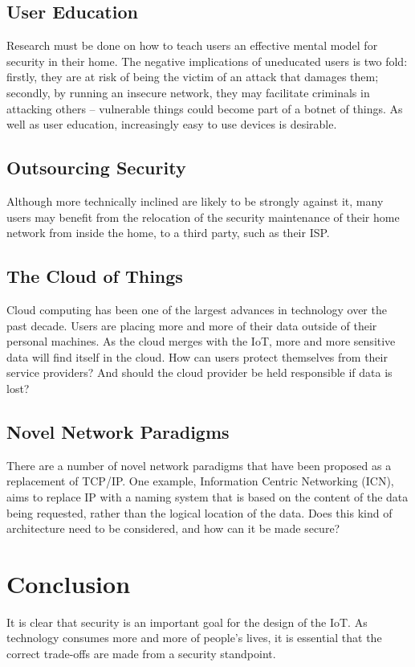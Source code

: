 \documentclass[10pt,journal,compsoc]{IEEEtran}
\begin{document}
\subsection{User Education}
Research must be done on how to teach users an effective mental model for
security in their home. The negative implications of uneducated users is two
fold: firstly, they are at risk of being the victim of an attack that damages
them; secondly, by running an insecure network, they may facilitate criminals
in attacking others -- vulnerable things could become part of a botnet of
things. As well as user education, increasingly easy to use devices is
desirable. 

\subsection{Outsourcing Security}
Although more technically inclined are likely to be strongly against it, many
users may benefit from the relocation of the security maintenance of their home
network from inside the home, to a third party, such as their ISP. 

\subsection{The Cloud of Things}
Cloud computing has been one of the largest advances in technology over the
past decade. Users are placing more and more of their data outside of their
personal machines. As the cloud merges with the IoT, more and more sensitive
data will find itself in the cloud. How can users protect themselves from their
service providers? And should the cloud provider be held responsible if data is
lost?

\subsection{Novel Network Paradigms}
There are a number of novel network paradigms that have been proposed as a
replacement of TCP/IP. One example, Information Centric Networking (ICN), aims
to replace IP with a naming system that is based on the content of the data
being requested, rather than the logical location of the data. Does this kind of
architecture need to be considered, and how can it be made secure?


\section{Conclusion}
It is clear that security is an important goal for the design of the IoT. As
technology consumes more and more of people's lives, it is essential that the
correct trade-offs are made from a security standpoint. 
\end{document}
